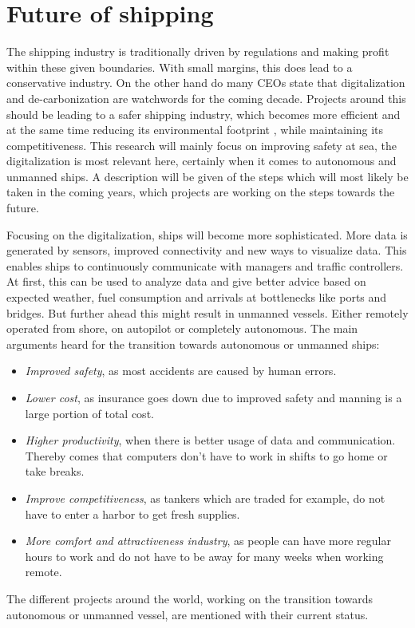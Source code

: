 \chapter{Future of shipping}
\label{sec:future}
The shipping industry is traditionally driven by regulations and making profit within these given boundaries. With small margins, this does lead to a conservative industry. On the other hand do many CEOs state that digitalization and de-carbonization are watchwords for the coming decade. Projects around this should be leading to a safer shipping industry, which becomes more efficient and at the same time reducing its environmental footprint \cite{Eriksen2017}, while maintaining its competitiveness. This research will mainly focus on improving safety at sea, the digitalization is most relevant here, certainly when it comes to autonomous and unmanned ships. A description will be given of the steps which will most likely be taken in the coming years, which projects are working on the steps towards the future.

Focusing on the digitalization, ships will become more sophisticated. More data is generated by sensors, improved connectivity and new ways to visualize data. This enables ships to continuously communicate with managers and traffic controllers. At first, this can be used to analyze data and give better advice based on expected weather, fuel consumption and arrivals at bottlenecks like ports and bridges.
But further ahead this might result in unmanned vessels. Either remotely operated from shore, on autopilot or completely autonomous. The main arguments heard for the transition towards autonomous or unmanned ships:
\begin{itemize}
	\item \emph{Improved safety}, as most accidents are caused by human errors.
	\item \emph{Lower cost}, as insurance goes down due to improved safety and manning is a large portion of total cost.
	\item \emph{Higher productivity}, when there is better usage of data and communication. Thereby comes that computers don't have to work in shifts to go home or take breaks.
	\item \emph{Improve competitiveness}, as tankers which are traded for example, do not have to enter a harbor to get fresh supplies.
	\item \emph{More comfort and attractiveness industry}, as people can have more regular hours to work and do not have to be away for many weeks when working remote.
\end{itemize}
The different projects around the world, working on the transition towards autonomous or unmanned vessel, are mentioned with their current status.

